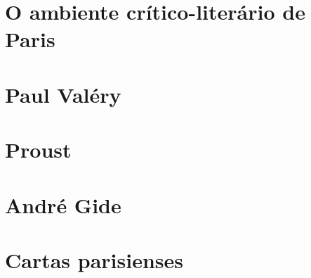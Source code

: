 

\part{O ambiente crítico-literário de Paris}




\part{Paul Valéry}



\part{Proust}


\part{André Gide}




\part{Cartas parisienses}




